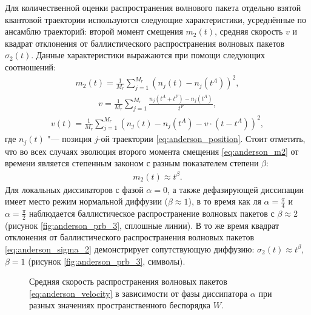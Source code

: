 Для количественной оценки распространения волнового пакета отдельно взятой квантовой траектории используются следующие характеристики, усреднённые по ансамблю траекторий: второй момент смещения \(m_2(t)\), средняя скорость \(v\) и квадрат отклонения от баллистического распространения волновых пакетов \(\sigma_2(t)\). Данные характеристики выражаются при помощи следующих соотношений:
\begin{equation}
\label{eq:anderson_m2}
\begin{gathered}
m_2(t) = \frac{1}{M_r} \sum_{j=1}^{M_r} \left( n_j(t) - n_j(t^A) \right)^2,
\end{gathered}
\end{equation}
\begin{equation}
\label{eq:anderson_velocity}
\begin{gathered}
v = \frac{1}{M_r} \sum_{j=1}^{M_r} \frac{n_j(t^A + t^F) - n_j(t^A)}{t^F},
\end{gathered}
\end{equation}
\begin{equation}
\label{eq:anderson_sigma_2}
\begin{gathered}
v(t) = \frac{1}{M_r} \sum_{j=1}^{M_r} \left( n_j(t) - n_j(t^A) - v \cdot (t-t^A) \right)^2,
\end{gathered}
\end{equation}
где \(n_j(t)\) "--- позиция \(j\)-ой траектории \cref{eq:anderson_position}. Стоит отметить, что во всех случаях эволюция второго момента смещения \cref{eq:anderson_m2} от времени является степенным законом с разным показателем степени \(\beta\):
\begin{equation}
\label{eq:anderson_m2_fit}
\begin{gathered}
m_2(t) \approx t^\beta .
\end{gathered}
\end{equation}
Для локальных диссипаторов с фазой \(\alpha=0\), а также дефазирующей диссипации имеет место режим нормальной диффузии (\(\beta \approx 1\)), в то время как ля \(\alpha=\frac{\pi}{4}\) и \(\alpha=\frac{\pi}{2}\) наблюдается баллистическое распространение волновых пакетов с \(\beta \approx 2\) (рисунок \cref{fig:anderson_prb_3}, сплошные линии). В то же время квадрат отклонения от баллистического распространения волновых пакетов \cref{eq:anderson_sigma_2} демонстрирует сопутствующую диффузию: \(\sigma_2(t) \approx t^\beta\), \(\beta=1\) (рисунок \cref{fig:anderson_prb_3}, символы).

\begin{figure}[h]
	\caption{
		Средняя скорость распространения волновых пакетов \cref{eq:anderson_velocity} в зависимости от фазы диссипатора \(\alpha\) при разных значениях пространственного беспорядка \(W\).
	}
	\label{fig:anderson_prb_4}
\end{figure}

